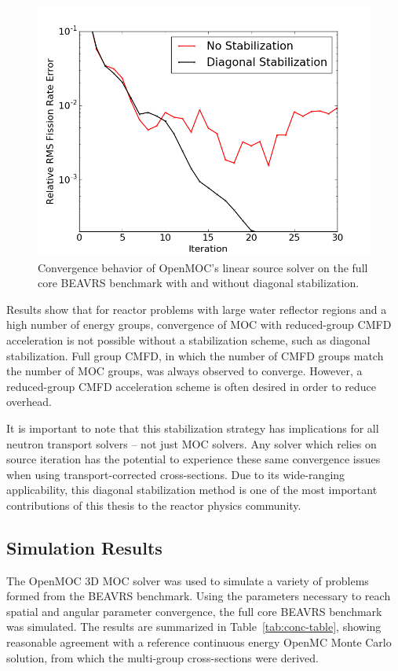 \begin{figure}[ht!]
	\centering
	\includegraphics[width=0.71\linewidth]{figures/convergence/full-core-3D-ls.png}
	\caption{Convergence behavior of OpenMOC's linear source solver on the full core \ac{BEAVRS} benchmark with and without diagonal stabilization.}
	\label{fig:conc-fc-divergence}
\end{figure}

Results show that for reactor problems with large water reflector regions and a high number of energy groups, convergence of \ac{MOC} with reduced-group \ac{CMFD} acceleration is not possible without a stabilization scheme, such as diagonal stabilization. Full group \ac{CMFD}, in which the number of \ac{CMFD} groups match the number of \ac{MOC} groups, was always observed to converge. However, a reduced-group \ac{CMFD} acceleration scheme is often desired in order to reduce overhead.

It is important to note that this stabilization strategy has implications for all neutron transport solvers -- not just MOC solvers. Any solver which relies on source iteration has the potential to experience these same convergence issues when using transport-corrected cross-sections. Due to its wide-ranging applicability, this diagonal stabilization method is one of the most important contributions of this thesis to the reactor physics community. 

\subsection{Simulation Results}
\label{sec:sub:sim-results}

The OpenMOC 3D \ac{MOC} solver was used to simulate a variety of problems formed from the BEAVRS benchmark. Using the parameters necessary to reach spatial and angular parameter convergence, the full core BEAVRS benchmark was simulated.  The results are summarized in Table~\ref{tab:conc-table}, showing reasonable agreement with a reference continuous energy OpenMC Monte Carlo solution, from which the multi-group cross-sections were derived. 

